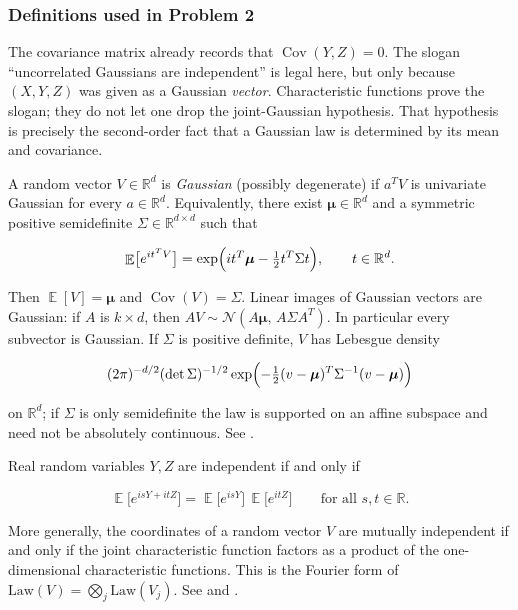 \documentclass[11pt,a4paper]{article}
\DeclareMathOperator{\E}{\mathbb{E}}
\begin{document}
\subsubsection{Definitions used in Problem 2}

The covariance matrix already records that \(\operatorname{Cov}(Y,Z)=0\). The slogan ``uncorrelated Gaussians are independent'' is legal here, but only because \((X,Y,Z)\) was given as a Gaussian \emph{vector}. Characteristic functions prove the slogan; they do not let one drop the joint-Gaussian hypothesis. That hypothesis is precisely the second-order fact that a Gaussian law is determined by its mean and covariance.

\begin{definition}
\label{def:gaussian-vector}
A random vector \( V\in\mathbb{R}^{d} \) is \emph{Gaussian} (possibly degenerate) if \( a^{T}V \) is univariate Gaussian for every \( a\in\mathbb{R}^{d} \). Equivalently, there exist \( \bm{\mu}\in\mathbb{R}^{d} \) and a symmetric positive semidefinite \( \Sigma\in\mathbb{R}^{d\times d} \) such that

\[
\E\bigl[e^{it^{T}V}\bigr]
=
\exp\Bigl(it^{T}\bm{\mu}-\tfrac12 t^{T}\Sigma t\Bigr),
\qquad
t\in\mathbb{R}^{d}.
\]

Then \( \E[V]=\bm{\mu} \) and \( \operatorname{Cov}(V)=\Sigma \). Linear images of Gaussian vectors are Gaussian: if \( A \) is \( k\times d \), then \( AV\sim\mathcal{N}(A\bm{\mu},\,A\Sigma A^{T}) \). In particular every subvector is Gaussian. If \( \Sigma \) is positive definite, \( V \) has Lebesgue density

\[
(2\pi)^{-d/2}(\det\Sigma)^{-1/2}
\exp\Bigl(-\tfrac12(v-\bm{\mu})^{T}\Sigma^{-1}(v-\bm{\mu})\Bigr)
\]

on \( \mathbb{R}^{d} \); if \( \Sigma \) is only semidefinite the law is supported on an affine subspace and need not be absolutely continuous. See \citep[\S3.3, \S3.9]{durrett2010}.
\end{definition}

\begin{proposition}
\label{prop:chf-indep}
Real random variables \( Y,Z \) are independent if and only if

\[
\E\bigl[e^{isY+itZ}\bigr]
=
\E\bigl[e^{isY}\bigr]\,\E\bigl[e^{itZ}\bigr]
\qquad
\text{for all }s,t\in\mathbb{R}.
\]

More generally, the coordinates of a random vector \( V \) are mutually independent if and only if the joint characteristic function factors as a product of the one-dimensional characteristic functions. This is the Fourier form of \( \mathrm{Law}(V)=\bigotimes_{j}\mathrm{Law}(V_{j}) \). See \citep[Theorem~3.3.2]{durrett2010} and \citep[Theorem~8.4.4]{ren2024}.
\end{proposition}
\end{document}
